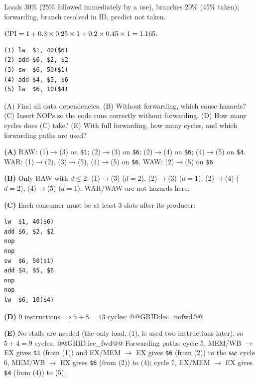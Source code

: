 \documentclass[11pt]{article}
\begin{document}
\begin{exercise}
Loads 30\% (25\% followed immediately by a use), branches 20\% (45\%
taken); forwarding, branch resolved in ID, predict not taken.
\end{exercise}
\begin{solution}
$\mathrm{CPI} = 1 + 0.3\times0.25\times1 + 0.2\times0.45\times1 = 1.165$.
\end{solution}

\begin{exercise}\label{e:lecture}
\leavevmode
\begin{lstlisting}
(1) lw  $1, 40($6)
(2) add $6, $2, $2
(3) sw  $6, 50($1)
(4) add $4, $5, $6
(5) lw  $6, 10($4)
\end{lstlisting}
(A) Find all data dependencies. (B) Without forwarding, which cause hazards?
(C) Insert NOPs so the code runs correctly without forwarding. (D) How many
cycles does (C) take? (E) With full forwarding, how many cycles, and which
forwarding paths are used?
\end{exercise}
\begin{solution}
\textbf{(A)} RAW: (1)$\to$(3) on \texttt{\$1}; (2)$\to$(3) on \texttt{\$6};
(2)$\to$(4) on \texttt{\$6}; (4)$\to$(5) on \texttt{\$4}.
WAR: (1)$\to$(2), (3)$\to$(5), (4)$\to$(5) on \texttt{\$6}.
WAW: (2)$\to$(5) on \texttt{\$6}.

\textbf{(B)} Only RAW with $d\le2$: (1)$\to$(3) ($d=2$), (2)$\to$(3)
($d=1$), (2)$\to$(4) ($d=2$), (4)$\to$(5) ($d=1$). WAR/WAW are not hazards
here.

\textbf{(C)} Each consumer must be at least 3 slots after its producer:
\begin{lstlisting}
lw  $1, 40($6)
add $6, $2, $2
nop
nop
sw  $6, 50($1)
add $4, $5, $6
nop
nop
lw  $6, 10($4)
\end{lstlisting}
\textbf{(D)} 9 instructions $\Rightarrow 5 + 8 = 13$ cycles:
@@GRID:lec_nofwd@@

\textbf{(E)} No stalls are needed (the only load, (1), is used two
instructions later), so $5+4 = 9$ cycles:
@@GRID:lec_fwd@@
Forwarding paths: cycle 5, MEM/WB $\to$ EX gives \texttt{\$1} (from (1)) and
EX/MEM $\to$ EX gives \texttt{\$6} (from (2)) to the \texttt{sw}; cycle 6,
MEM/WB $\to$ EX gives \texttt{\$6} (from (2)) to (4); cycle 7, EX/MEM $\to$
EX gives \texttt{\$4} (from (4)) to (5).
\end{solution}

\end{document}
